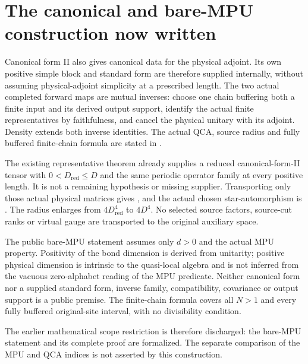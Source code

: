 \documentclass[11pt]{article}
\begin{document}
\section{The canonical and bare-MPU construction now written}

Canonical form II also gives canonical data for the physical adjoint.
Its own positive simple block and standard form are therefore supplied
internally, without assuming physical-adjoint simplicity at a prescribed
length. The two actual completed forward maps are mutual inverses:
choose one chain buffering both a finite input and its derived output
support, identify the actual finite representatives by faithfulness, and
cancel the physical unitary with its adjoint. Density extends both
inverse identities. The actual QCA, source radius and fully buffered
finite-chain formula are stated in
.

The existing representative theorem
already supplies a reduced canonical-form-II tensor with
$0<D_{\mathrm{red}}\le D$ and the same periodic operator family at every
positive length. It is not a remaining hypothesis or missing supplier.
Transporting only those actual physical matrices gives
, and the actual chosen
star-automorphism is
.
The radius enlarges from $4D_{\mathrm{red}}^4$ to $4D^4$.
No selected source factors, source-cut ranks or virtual gauge are
transported to the original auxiliary space.

The public bare-MPU statement assumes only $d>0$ and the actual MPU
property. Positivity of the bond dimension is derived from unitarity;
positive physical dimension is intrinsic to the quasi-local algebra and
is not inferred from the vacuous zero-alphabet reading of the MPU
predicate. Neither canonical form nor a supplied standard form, inverse
family, compatibility, covariance or output support is a public premise.
The finite-chain formula covers all $N>1$ and every fully buffered
original-site interval, with no divisibility condition.

The earlier mathematical scope restriction is therefore discharged:
the bare-MPU statement and its complete proof are formalized. The
separate comparison of the MPU and QCA indices is not asserted by this
construction.
\end{document}
